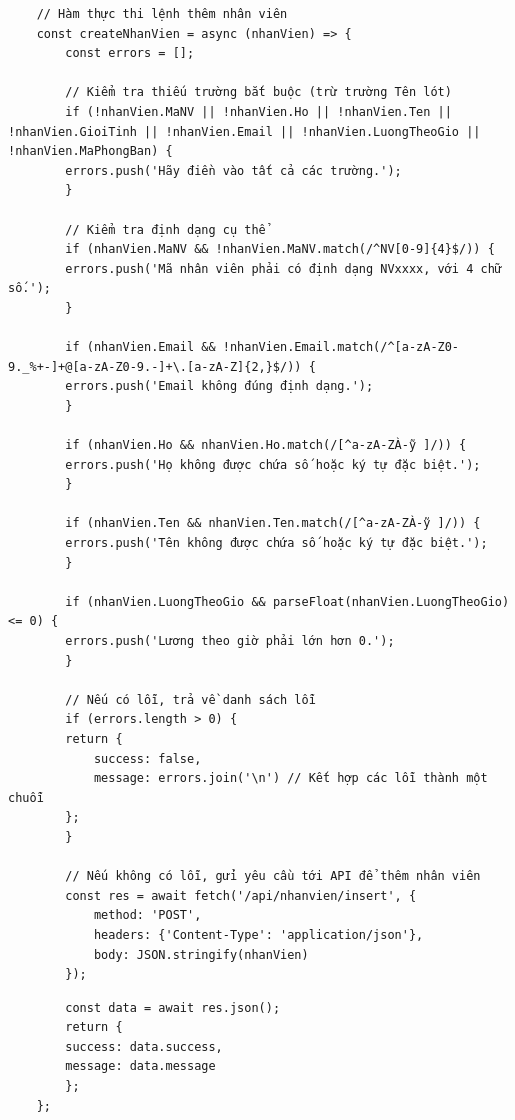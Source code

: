 \begin{verbatim}
    // Hàm thực thi lệnh thêm nhân viên
    const createNhanVien = async (nhanVien) => {
        const errors = [];
    
        // Kiểm tra thiếu trường bắt buộc (trừ trường Tên lót)
        if (!nhanVien.MaNV || !nhanVien.Ho || !nhanVien.Ten || !nhanVien.GioiTinh || !nhanVien.Email || !nhanVien.LuongTheoGio || !nhanVien.MaPhongBan) {
        errors.push('Hãy điền vào tất cả các trường.');
        }
    
        // Kiểm tra định dạng cụ thể
        if (nhanVien.MaNV && !nhanVien.MaNV.match(/^NV[0-9]{4}$/)) {
        errors.push('Mã nhân viên phải có định dạng NVxxxx, với 4 chữ số.');
        }
    
        if (nhanVien.Email && !nhanVien.Email.match(/^[a-zA-Z0-9._%+-]+@[a-zA-Z0-9.-]+\.[a-zA-Z]{2,}$/)) {
        errors.push('Email không đúng định dạng.');
        }
    
        if (nhanVien.Ho && nhanVien.Ho.match(/[^a-zA-ZÀ-ỹ ]/)) {
        errors.push('Họ không được chứa số hoặc ký tự đặc biệt.');
        }
    
        if (nhanVien.Ten && nhanVien.Ten.match(/[^a-zA-ZÀ-ỹ ]/)) {
        errors.push('Tên không được chứa số hoặc ký tự đặc biệt.');
        }
    
        if (nhanVien.LuongTheoGio && parseFloat(nhanVien.LuongTheoGio) <= 0) {
        errors.push('Lương theo giờ phải lớn hơn 0.');
        }
    
        // Nếu có lỗi, trả về danh sách lỗi
        if (errors.length > 0) {
        return {
            success: false,
            message: errors.join('\n') // Kết hợp các lỗi thành một chuỗi
        };
        }
    
        // Nếu không có lỗi, gửi yêu cầu tới API để thêm nhân viên
        const res = await fetch('/api/nhanvien/insert', {
            method: 'POST',
            headers: {'Content-Type': 'application/json'},
            body: JSON.stringify(nhanVien)
        });
\end{verbatim}
\begin{verbatim}
        const data = await res.json();
        return {
        success: data.success,
        message: data.message
        };
    };
\end{verbatim}

